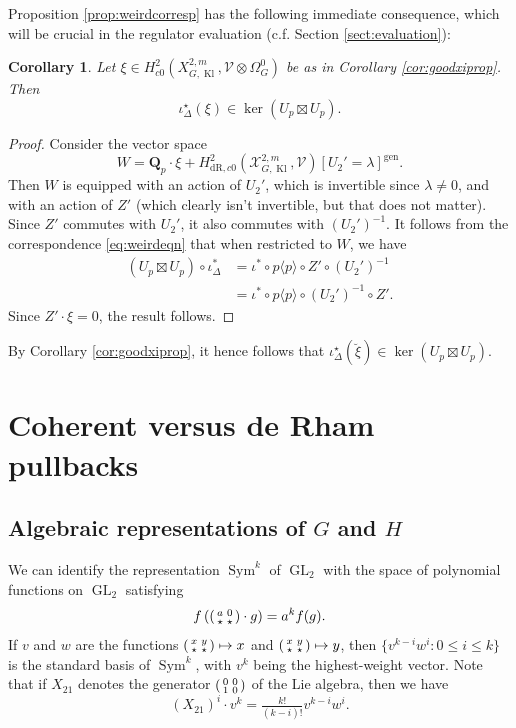 \documentclass[cjm]{ipart}
\newenvironment{smatrix}{\left( \begin{smallmatrix} } {\end{smallmatrix} \right) }
\newcommand{\stbt}[4]{\begin{smatrix}#1 & #2 \\ #3 & #4\end{smatrix}}
\theoremstyle{plain}
\newtheorem{corollary}[theorem]{Corollary}
\theoremstyle{remark}
\DeclareMathOperator{\gen}{gen}
\DeclareMathOperator{\GL}{GL}
\DeclareMathOperator{\Kl}{Kl}
\DeclareMathOperator{\Sym}{Sym}
\newcommand{\QQ}{\mathbf{Q}}
\newcommand{\Qp}{\QQ_p}
\newcommand{\cV}{\mathcal{V}}
\newcommand{\cX}{\mathcal{X}}
\newcommand{\dR}{\mathrm{dR}}
\numberwithin{equation}{subsection}
\renewcommand{\le}{\leqslant}
\begin{document}
  Proposition \ref{prop:weirdcorresp} has the following immediate consequence, which will be crucial in the regulator evaluation (c.f. Section \ref{sect:evaluation}):

     \begin{corollary}\label{pullbackinkerUp}
    Let $\xi\in H^2_{c0}(X_{G,\Kl}^{2,m}, \cV\otimes\Omega_G^0)$ be as in Corollary \ref{cor:goodxiprop}. Then
    \[ \iota_\Delta^\star(\xi) \in \ker( U_p \boxtimes U_p).\]
   \end{corollary}
     \begin{proof}
      Consider the vector space
      \[ W=\Qp\cdot \xi + H^2_{\dR,c0}(\cX^{2,m}_{G,\Kl},\cV)[U_2'=\lambda]^{\gen}.\]
      Then $W$ is equipped with an action of $U_2'$, which is invertible since $\lambda\neq 0$, and with an action of $Z'$ (which clearly isn't invertible, but that does not matter). Since $Z'$ commutes with $U_2'$, it also commutes with $(U_2')^{-1}$. It follows from the correspondence \eqref{eq:weirdeqn} that when restricted to $W$, we have
      \begin{align*}
        (U_p\boxtimes U_p)\circ\iota_\Delta^*&=\iota^*\circ p\langle p\rangle\circ Z'\circ (U_2')^{-1}\\
        & = \iota^*\circ p\langle p\rangle\circ (U_2')^{-1}\circ Z'.
        \end{align*}
      Since $Z'\cdot \xi =0$, the result follows.
     \end{proof}

  \begin{note}\label{note:pullbackofxiprop}
   By Corollary \ref{cor:goodxiprop}, it hence follows that $ \iota_\Delta^\star(\breve{\xi}) \in \ker( U_p \boxtimes U_p)$.
  \end{note}



 \section{Coherent versus de Rham pullbacks}

  \subsection{Algebraic representations of $G$ and $H$}\label{ss:algrep}

   We can identify the representation $\Sym^k$ of $\GL_2$ with the space of polynomial functions on $\GL_2$ satisfying
   \[ f\left(\stbt{a}{0}{\star}{\star} \cdot g\right) = a^k f(g). \]
   If $v$ and $w$ are the functions $\stbt x y \star \star \mapsto x$ and $\stbt x y \star \star \mapsto y$, then $\{ v^{k-i} w^i : 0 \le i \le k\}$ is the standard basis of $\Sym^k$, with $v^k$ being the highest-weight vector. Note that if $X_{21}$ denotes the generator $\stbt{0}{0}{1}{0}$ of the Lie algebra, then we have
   \[ (X_{21})^i \cdot v^k = \tfrac{k!}{(k-i)!} v^{k-i} w^i. \]
\end{document}
